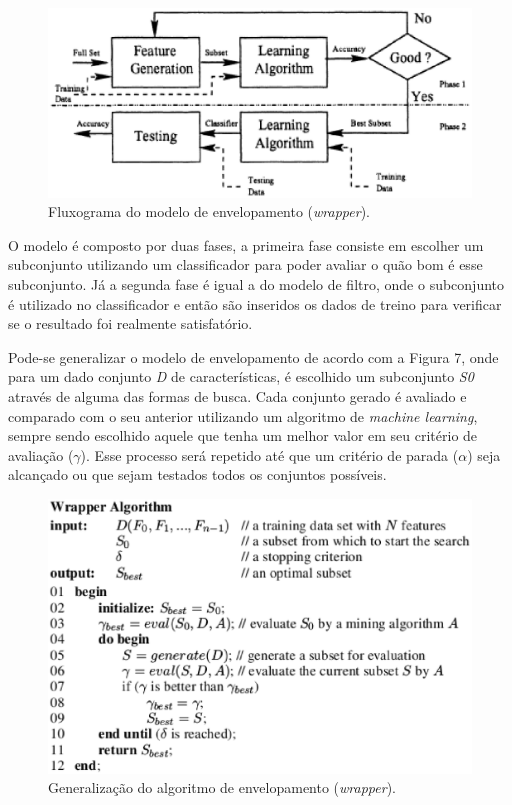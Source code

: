 \begin{figure}[h]
	\centering
	\label{fig07}
		\includegraphics[keepaspectratio=true,scale=1]{figuras/fig06.eps}
	\caption{Fluxograma do modelo de envelopamento (\textit{wrapper}). \cite{huan_1998}}
\end{figure}

O modelo é composto por duas fases, a primeira fase consiste em escolher um subconjunto utilizando um classificador para poder avaliar o quão bom é esse subconjunto. Já a segunda fase é igual a do modelo de filtro, onde o subconjunto é utilizado no classificador e então são inseridos os dados de treino para verificar se o resultado foi realmente satisfatório.

Pode-se generalizar o modelo de envelopamento de acordo com a Figura 7, onde para um dado conjunto \textit{D} de características, é escolhido um subconjunto \textit{S0} através de alguma das formas de busca. Cada conjunto gerado é avaliado e comparado com o seu anterior utilizando um algoritmo de \textit{machine learning}, sempre sendo escolhido aquele que tenha um melhor valor em seu critério de avaliação ($\gamma$). Esse processo será repetido até que um critério de parada ($\alpha$) seja alcançado ou que sejam testados todos os conjuntos possíveis. \cite{liu_2005}


\begin{figure}[h]
	\centering
	\label{fig08}
		\includegraphics[keepaspectratio=true,scale=0.7]{figuras/fig08.eps}
	\caption{Generalização do algoritmo de envelopamento (\textit{wrapper}). \cite{liu_2005}}
\end{figure}

